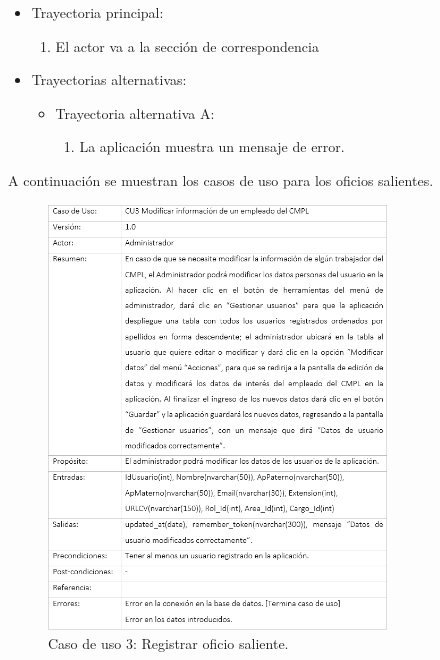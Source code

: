 			\begin{itemize}
				\item Trayectoria principal:
					\begin{enumerate}
						\item El actor va a la sección de correspondencia 
					\end{enumerate}
				\item Trayectorias alternativas:
					\begin{itemize}
						\item Trayectoria alternativa A:
							\begin{enumerate}
								\item La aplicación muestra un mensaje de error.
							\end{enumerate}
					\end{itemize}
			\end{itemize}

A continuación se muestran los casos de uso para los oficios salientes.
\begin{figure}[htbp!]
		\centering
			\includegraphics[width=0.8\textwidth]{images/CU/CU3}
		\caption{Caso de uso 3: Registrar oficio saliente.}
		\label{Tabla}
	\end{figure}

